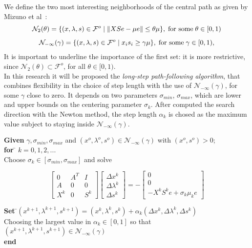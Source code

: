 \documentclass[a4paper,10 pt,titlepage,twoside]{book}
\theoremstyle{plain}
\theoremstyle{definition}
\theoremstyle{remark}
\begin{document}
 We define the two most interesting neighborhoods of the central path as given
by Mizuno et al~\cite{5}:\\
\begin{equation*}
\mathcal{N}_{2}(\theta) =\{(x, \lambda,s)\in\mathcal{F}^{o} \;|\;\lVert XSe - \mu e \rVert \leq \theta \mu \}, \text{\;for some\;} \theta \in [0,1)
\end{equation*} 
\begin{equation*}
\mathcal{N}_{-\infty}(\gamma) =\{ (x, \lambda,s)\in\mathcal{F}^{o} \;|\; x_{i}s_{i} \geq \gamma \mu \}, \text{\;for some\;} \gamma \in [0,1),
\end{equation*} 
It is important to underline the importance of the first set: it is more restrictive, since $\mathcal{N}_{2}(\theta) \subset\mathcal{F}^{o}$, for all $\theta\in[0,1)$.\\
In this research it will be proposed the \textit{long-step path-following algorithm}, that combines flexibility in the choice of step length with the use of $\mathcal{N}_{-\infty}(\gamma)$, for some $\gamma$ close to zero. It depends on two parameters $\sigma_{min}$, $\sigma_{max}$, which are lower and upper bounds on the centering parameter $\sigma_{k}$. After computed the search direction with the Newton method, the step length $\alpha_{k}$ is chosed as the maximum value subject to staying inside $\mathcal{N}_{-\infty}(\gamma)$.
\begin{tabbing}
	\textbf{Given} $\gamma, \sigma_{min}, \sigma_{max}$ and $(x^{o}, \lambda^{o}, s^{o})\in\mathcal{N}_{-\infty}(\gamma)$ with $(x^{o}, s^{o})>0$;\\
	\textbf{for} \= $k = 0, 1, 2,...$ \\
	\> Choose $\sigma_{k}\in[\sigma_{min},\sigma_{max}]$ and solve
\end{tabbing}
\begin{equation}\label{(5.9)}
\begin{bmatrix}
0&A^{T}&I \\A&0&0\\X^{k}&0&S^{k}
\end{bmatrix}\begin{bmatrix}
\Delta x^{k}\\\Delta\lambda^{k} \\\Delta s^{k}
\end{bmatrix}=-\begin{bmatrix}
0\\0\\-X^{k}S^{k}e + \sigma_{k}\mu_{k}e
\end{bmatrix}
\end{equation}
\begin{tabbing}
	\textbf{Set} \=$(x^{k+1}, \lambda^{k+1}, s^{k+1}) = (x^{k}, \lambda^{k}, s^{k})+ \alpha_{k}(\Delta x^{k}, \Delta\lambda^{k}, \Delta s^{k})$\\
	\> Choosing the largest value in $\alpha_{k}\in[0,1]$ so that $(x^{k+1}, \lambda^{k+1}, s^{k+1})\in\mathcal{N}_{-\infty}(\gamma)$\\
	\textbf{end}
\end{tabbing}
 \newpage
\end{document}
